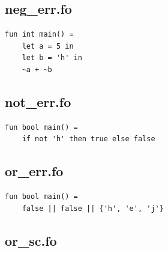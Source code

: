 \documentclass[11pt]{article}
\begin{document}
    \subsection{neg\_err.fo}
    \begin{lstlisting}[basicstyle=\small]
fun int main() =
    let a = 5 in
    let b = 'h' in
    ~a + ~b
    \end{lstlisting}

    \subsection{not\_err.fo}
    \begin{lstlisting}[basicstyle=\small]
fun bool main() =
    if not 'h' then true else false
    \end{lstlisting}

    \subsection{or\_err.fo}
    \begin{lstlisting}[basicstyle=\small]
fun bool main() =
    false || false || {'h', 'e', 'j'}
    \end{lstlisting}

    \subsection{or\_sc.fo}
    \begin{lstlisting}[basicstyle=\small]

    \end{lstlisting}
\end{document}
